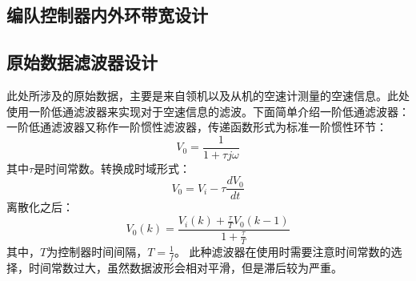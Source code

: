 \subsection{编队控制器内外环带宽设计}

\subsection{原始数据滤波器设计}
此处所涉及的原始数据，主要是来自领机以及从机的空速计测量的空速信息。此处使用一阶低通滤波器来实现对于空速信息的滤波。下面简单介绍一阶低通滤波器：
一阶低通滤波器又称作一阶惯性滤波器，传递函数形式为标准一阶惯性环节：
\begin{equation}
    V_0=\frac{1}{1+\tau j\omega}
\end{equation}
其中$\tau$是时间常数。转换成时域形式：
\begin{equation}
    V_0=V_i -\tau\frac{dV_0}{dt}
\end{equation}
离散化之后：
\begin{equation}
    V_0(k)=\frac{V_i(k)+\frac{\tau}{T}V_0(k-1)}{1+\frac{\tau}{T}}
\end{equation}
其中，$T$为控制器时间间隔，$T=\frac{1}{f}$。
此种滤波器在使用时需要注意时间常数的选择，时间常数过大，虽然数据波形会相对平滑，但是滞后较为严重。
